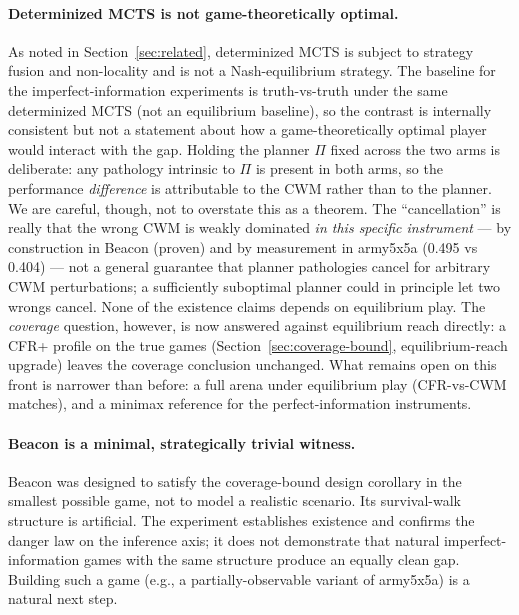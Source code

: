 \documentclass[11pt]{article}
\theoremstyle{remark}
\begin{document}
\paragraph{Determinized MCTS is not game-theoretically optimal.} As noted in Section~\ref{sec:related}, determinized MCTS is subject to strategy fusion and non-locality and is not a Nash-equilibrium strategy. The baseline for the imperfect-information experiments is truth-vs-truth under the same determinized MCTS (not an equilibrium baseline), so the contrast is internally consistent but not a statement about how a game-theoretically optimal player would interact with the gap. Holding the planner $\Pi$ fixed across the two arms is deliberate: any pathology intrinsic to $\Pi$ is present in both arms, so the performance \emph{difference} is attributable to the CWM rather than to the planner. We are careful, though, not to overstate this as a theorem. The ``cancellation'' is really that the wrong CWM is weakly dominated \emph{in this specific instrument} --- by construction in Beacon (proven) and by measurement in army5x5a (0.495 vs 0.404) --- not a general guarantee that planner pathologies cancel for arbitrary CWM perturbations; a sufficiently suboptimal planner could in principle let two wrongs cancel. None of the existence claims depends on equilibrium play. The \emph{coverage} question, however, is now answered against equilibrium reach directly: a CFR+ profile on the true games (Section~\ref{sec:coverage-bound}, equilibrium-reach upgrade) leaves the coverage conclusion unchanged. What remains open on this front is narrower than before: a full arena under equilibrium play (CFR-vs-CWM matches), and a minimax reference for the perfect-information instruments.

\paragraph{Beacon is a minimal, strategically trivial witness.} Beacon was designed to satisfy the coverage-bound design corollary in the smallest possible game, not to model a realistic scenario. Its survival-walk structure is artificial. The experiment establishes existence and confirms the danger law on the inference axis; it does not demonstrate that natural imperfect-information games with the same structure produce an equally clean gap. Building such a game (e.g., a partially-observable variant of army5x5a) is a natural next step.
\end{document}
